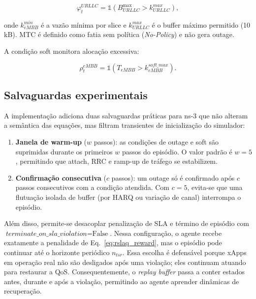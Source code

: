 \documentclass[10pt,a4paper]{IEEEtran}
\begin{document}
\begin{equation}
\varphi^{\textit{URLLC}}_t = \mathbb{1}\!\left(
B^{\max}_{\textit{URLLC}} > k^{\textit{max}}_{\textit{URLLC}}\right),
\label{eq:outage_urllc}
\end{equation}

onde $k^{\textit{min}}_{\textit{eMBB}}$ \'{e} a vaz\~{a}o
m\'{i}nima por slice e $k^{\textit{max}}_{\textit{URLLC}}$ \'{e}
o buffer m\'{a}ximo permitido (10\,kB). MTC \'{e} definido como
fatia sem pol\'{i}tica (\emph{No-Policy}) e n\~{a}o gera outage.

A condi\c{c}\~{a}o soft monitora aloca\c{c}\~{a}o excessiva:

\begin{equation}
\rho^{\textit{eMBB}}_t = \mathbb{1}\!\left(
T_{\textit{eMBB}} > k^{\textit{soft\_max}}_{\textit{eMBB}}\right).
\label{eq:soft}
\end{equation}

\subsection{Salvaguardas experimentais}

A implementa\c{c}\~{a}o adiciona duas salvaguardas
pr\'{a}ticas para ns-3 que n\~{a}o alteram a sem\^{a}ntica das
equa\c{c}\~{o}es, mas filtram transientes de
inicializa\c{c}\~{a}o do simulador:

\begin{enumerate}
\item \textbf{Janela de warm-up} ($w$ passos): as condi\c{c}\~{o}es
  de outage e soft s\~{a}o suprimidas durante os primeiros
  $w$ passos do epis\'{o}dio. O valor padr\~{a}o \'{e}
  $w=5$, permitindo que attach, RRC e ramp-up de tr\'{a}fego
  se estabilizem.
\item \textbf{Confirma\c{c}\~{a}o consecutiva}
  ($c$ passos): um outage s\'{o} \'{e} confirmado ap\'{o}s
  $c$ passos consecutivos com a condi\c{c}\~{a}o atendida.
  Com $c=5$, evita-se que uma flutua\c{c}\~{a}o isolada de
  buffer (por HARQ ou varia\c{c}\~{a}o de canal) interrompa o
  epis\'{o}dio.
\end{enumerate}

Al\'{e}m disso, permite-se desacoplar penaliza\c{c}\~{a}o de
SLA e t\'{e}rmino de epis\'{o}dio com
$\textit{terminate\_on\_sla\_violation}=\text{False}$. Nessa
configura\c{c}\~{a}o, o agente recebe exatamente a penalidade
de Eq.~\eqref{eq:rslaq_reward}, mas o epis\'{o}dio pode
continuar at\'{e} o horizonte peri\'{o}dico $n_{\textit{tsr}}$.
Essa escolha \'{e} defens\'{a}vel porque xApps em
opera\c{c}\~{a}o real n\~{a}o s\~{a}o desligados ap\'{o}s uma
viola\c{c}\~{a}o; eles continuam atuando para restaurar a QoS.
Consequentemente, o \emph{replay buffer} passa a conter
estados antes, durante e ap\'{o}s a viola\c{c}\~{a}o, permitindo
ao agente aprender din\^{a}micas de recupera\c{c}\~{a}o.
\end{document}
